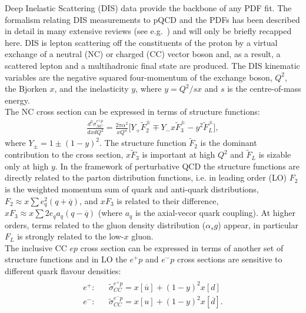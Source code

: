 Deep Inelastic Scattering (DIS) data provide the backbone of any PDF fit.
The formalism relating DIS measurements to pQCD and the PDFs has been described
 in detail in many extensive reviews (see e.g.~\cite{disbook}) and will only be briefly recapped here.
DIS is lepton scattering off the 
constituents of the proton by a virtual exchange of a neutral (NC) 
or charged (CC) vector boson and, as a result, a scattered lepton and a 
multihadronic final state are produced.
The DIS kinematic variables are the negative squared four-momentum of 
the exchange boson, $Q^2$, the Bjorken $x$, 
and the inelasticity $y$, where $y=Q^2/sx$ and $s$ is the centre-of-mass energy.
\\
%
The NC cross section can be expressed in terms of structure functions:
\begin{eqnarray}
   \frac{d^2\sigma_{NC}^{e^{\pm} p}}{dxdQ^2}=\frac{2\pi\alpha^2}{xQ^4} 
     \big [ Y_{+} \tilde F_2^{\pm} \mp Y_{-}x \tilde F_3^{\pm} - y^2 \tilde F_L^{\pm} \big ],
\end{eqnarray}
where $Y_{\pm} = 1 \pm (1-y)^2$. The structure function $\tilde F_2$
is the dominant contribution to the cross section, $x \tilde F_3$ is important at high $Q^2$ and $\tilde F_L$ is sizable 
only at high $y$. 
In the framework of perturbative QCD the structure functions are directly related to the 
parton distribution functions, i.e. in leading order (LO)  $F_2$ is the weighted momentum sum of quark and anti-quark distributions, 
$F_2 \approx x \sum e^2_q (q+ \overline q)$, and $xF_3$ is related to their difference, 
    $xF_3 \approx x \sum 2e_q a_q (q- \overline q)$ (where $a_q$ is the axial-vecor quark coupling). 
    At higher orders, terms related to the gluon density distribution
($\alpha_s g$) appear, in particular $F_L$ is strongly related to the low-$x$ 
gluon.
\\
The inclusive CC $ep$ cross section can be expressed 
in terms of another set of structure functions and in LO the $e^+p$ and $e^-p$ cross sections are sensitive to different quark flavour 
densities:
\begin{eqnarray}
    \begin{array}{rll}
   e^{+}:  & & \tilde \sigma_{CC}^{e^{+} p} = 
                x[\overline u] + (1-y)^2 x[ d]  \\
   e^{-}:  & & \tilde \sigma_{CC}^{e^{-} p} = 
                x[ u] + (1-y)^2 x[\overline d].
    \end{array}
\end{eqnarray}
